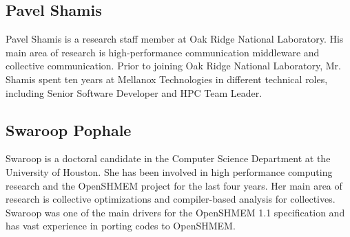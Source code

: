\documentclass[10pt,english]{article}
\begin{document}
\subsection{Pavel Shamis}

    Pavel Shamis is a research staff member at Oak Ridge National
    Laboratory.  His main area of research is high-performance
    communication middleware and collective communication. Prior to
    joining Oak Ridge National Laboratory, Mr. Shamis spent ten years
    at Mellanox Technologies in different technical roles, including
    Senior Software Developer and HPC Team Leader.

\subsection{Swaroop Pophale}

   Swaroop is a doctoral candidate in the Computer Science Department
   at the University of Houston. She has been involved in high
   performance computing research and the OpenSHMEM project for the
   last four years. Her main area of research is collective
   optimizations and compiler-based analysis for collectives. Swaroop
   was one of the main drivers for the OpenSHMEM 1.1 specification and
   has vast experience in porting codes to OpenSHMEM.
\end{document}
